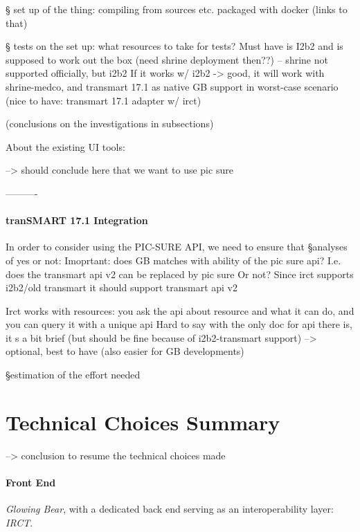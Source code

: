 § set up of the thing: compiling from sources etc. packaged with docker (links to that)

§ tests on the set up: what resources to take for tests? Must have is I2b2 and is supposed to work out the box (need shrine deployment then??) -- shrine not supported officially, but i2b2 
If it works w/ i2b2 -> good, it will work with shrine-medco, and transmart 17.1 as native GB support in worst-case scenario (nice to have: transmart 17.1 adapter w/ irct)

(conclusions on the investigations in subsections)


About the existing UI tools: 

--> should conclude here that we want to use pic sure

----------
\paragraph{tranSMART 17.1 Integration}
In order to consider using the PIC-SURE API, we need to ensure that 
§analyses of yes or not: Imoprtant: does GB matches with ability of the pic sure api? I.e. does the transmart api v2 can be replaced by pic sure 
Or not? Since irct supports i2b2/old transmart it should support transmart api v2

Irct works with resources: you ask the api about resource and what it can do, and you can query it with a unique api
Hard to say with the only doc for api there is, it s a bit brief (but should be fine because of i2b2-transmart support)
--> optional, best to have (also easier for GB developments)

§estimation of the effort needed



\section{Technical Choices Summary}
--> conclusion to resume the technical choices made


\paragraph{Front End}
\emph{Glowing Bear}, with a dedicated back end serving as an interoperability layer: \emph{IRCT}.

